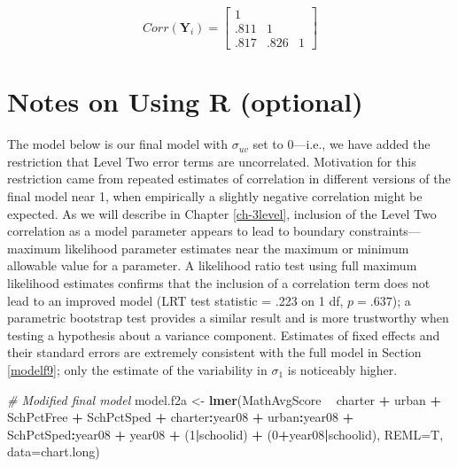 \documentclass[
]{krantz}
\newenvironment{Shaded}{\begin{snugshade}}{\end{snugshade}}
\newcommand{\CommentTok}[1]{\textcolor[rgb]{0.37,0.37,0.37}{\textit{#1}}}
\newcommand{\DataTypeTok}[1]{\textcolor[rgb]{0.27,0.27,0.27}{#1}}
\newcommand{\DecValTok}[1]{\textcolor[rgb]{0.06,0.06,0.06}{#1}}
\newcommand{\KeywordTok}[1]{\textcolor[rgb]{0.27,0.27,0.27}{\textbf{#1}}}
\newcommand{\NormalTok}[1]{#1}
\newcommand{\OperatorTok}[1]{\textcolor[rgb]{0.43,0.43,0.43}{\textbf{#1}}}
\newcommand{\StringTok}[1]{\textcolor[rgb]{0.5,0.5,0.5}{#1}}
\begin{document}
\[ Corr(\mathbf{Y}_i) =  \left[
          \begin{array}{cccc}
            1 & &   \\
            .811 & 1 &  \\
            .817 & .826 & 1
          \end{array} \right] \]

\hypertarget{notesr9}{%
\section{Notes on Using R (optional)}\label{notesr9}}

The model below is our final model with \(\sigma_{uv}\) set to 0---i.e., we have added the restriction that Level Two error terms are uncorrelated. Motivation for this restriction came from repeated estimates of correlation in different versions of the final model near 1, when empirically a slightly negative correlation might be expected. As we will describe in Chapter \ref{ch-3level}, inclusion of the Level Two correlation as a model parameter appears to lead to boundary constraints---maximum likelihood parameter estimates near the maximum or minimum allowable value for a parameter. A likelihood ratio test using full maximum likelihood estimates confirms that the inclusion of a correlation term does not lead to an improved model (LRT test statistic = .223 on 1 df, \(p=.637\)); a parametric bootstrap test provides a similar result and is more trustworthy when testing a hypothesis about a variance component. Estimates of fixed effects and their standard errors are extremely consistent with the full model in Section \ref{modelf9}; only the estimate of the variability in \(\sigma_{1}\) is noticeably higher.

\begin{Shaded}
\begin{Highlighting}[]
\CommentTok{# Modified final model}
\NormalTok{model.f2a <-}\StringTok{ }\KeywordTok{lmer}\NormalTok{(MathAvgScore }\OperatorTok{~}\StringTok{ }\NormalTok{charter }\OperatorTok{+}\StringTok{ }\NormalTok{urban }\OperatorTok{+}\StringTok{ }\NormalTok{SchPctFree }\OperatorTok{+}
\StringTok{  }\NormalTok{SchPctSped }\OperatorTok{+}\StringTok{ }\NormalTok{charter}\OperatorTok{:}\NormalTok{year08 }\OperatorTok{+}\StringTok{ }\NormalTok{urban}\OperatorTok{:}\NormalTok{year08 }\OperatorTok{+}
\StringTok{  }\NormalTok{SchPctSped}\OperatorTok{:}\NormalTok{year08 }\OperatorTok{+}\StringTok{ }\NormalTok{year08 }\OperatorTok{+}
\StringTok{  }\NormalTok{(}\DecValTok{1}\OperatorTok{|}\NormalTok{schoolid) }\OperatorTok{+}\StringTok{ }\NormalTok{(}\DecValTok{0}\OperatorTok{+}\NormalTok{year08}\OperatorTok{|}\NormalTok{schoolid), }\DataTypeTok{REML=}\NormalTok{T, }\DataTypeTok{data=}\NormalTok{chart.long)}
\end{Highlighting}
\end{Shaded}
\end{document}
